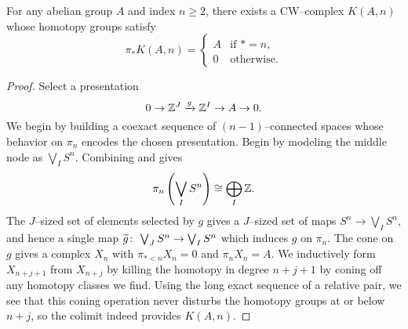 \begin{lemma}\label{EMSpacesExist}
For any abelian group $A$ and index $n \ge 2$, there exists a CW--complex $K(A, n)$ whose homotopy groups satisfy \[\pi_* K(A, n) = \begin{cases} A & \text{if $* = n$}, \\ 0 & \text{otherwise}. \end{cases}\]
\end{lemma}
\begin{proof}
Select a presentation \[0 \to \mathbb Z^J \xrightarrow g \mathbb Z^I \to A \to 0.\]
%
We begin by building a coexact sequence of $(n-1)$--connected spaces whose behavior on $\pi_n$ encodes the chosen presentation.
Begin by modeling the middle node as $\bigvee_I S^n$.
Combining  and  gives \[\pi_n\left( \bigvee_I S^n\right) \cong \bigoplus_I \mathbb Z.\]
The $J$--sized set of elements selected by $g$ gives a $J$--sized set of maps $S^n \to \bigvee_I S^n$, and hence a single map $\widetilde g\colon\thinspace \bigvee_J S^n \to \bigvee_I S^n$ which induces $g$ on $\pi_n$.
The cone on $g$ gives a complex $X_n$ with $\pi_{* < n} X_n = 0$ and $\pi_n X_n = A$.
We inductively form $X_{n+j+1}$ from $X_{n+j}$ by killing the homotopy in degree $n+j+1$ by coning off any homotopy classes we find.
Using the long exact sequence of a relative pair, we see that this coning operation never disturbs the homotopy groups at or below $n+j$, so the colimit indeed provides $K(A, n)$.
\end{proof}

